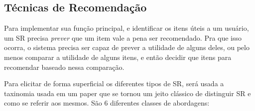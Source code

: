 \subsection{Técnicas de Recomendação}
Para implementar sua função principal, e identificar os itens úteis a um usuário, um SR precisa \emph{prever} que um item vale a pena ser recomendado. Pra que isso ocorra, o sistema precisa ser capaz de prever a utilidade de alguns deles, ou pelo menos comparar a utilidade de alguns itens, e então decidir que itens para recomendar baseado nessa comparação.

\par
Para elicitar de forma superficial os diferentes tipos de SR, será usada a taxinomia usada em um paper que se tornou um jeito clássico de distinguir SR e como se referir aos mesmos. São 6 diferentes classes de abordagens:


